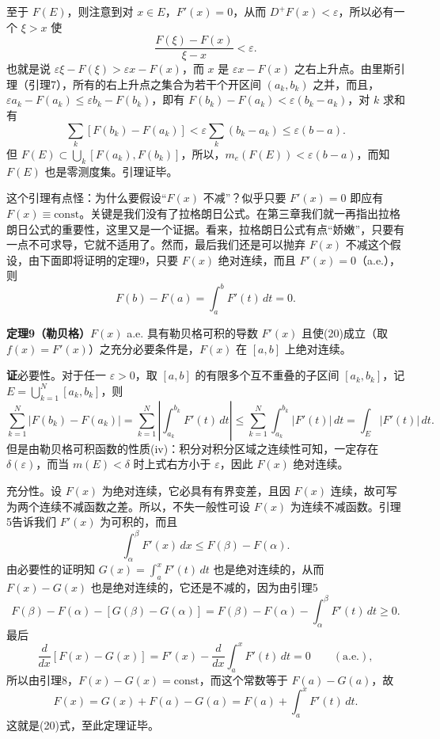 至于 $F(E)$，则注意到对 $x\in E$，$F'(x)=0$，从而 $D^+F(x)<\varepsilon$，所以必有一个 $\xi>x$ 使
\[
 \frac{F(\xi)-F(x)}{\xi-x}<\varepsilon.
\]
也就是说 $\varepsilon\xi-F(\xi)>\varepsilon x-F(x)$，而 $x$ 是 $\varepsilon x-F(x)$ 之右上升点。由里斯引理（引理7），所有的右上升点之集合为若干个开区间 $(a_k,b_k)$ 之并，而且，$\varepsilon a_k-F(a_k)\le\varepsilon b_k-F(b_k)$，即有 $F(b_k)-F(a_k)<\varepsilon(b_k-a_k)$，对 $k$ 求和有
\[
 \sum_k[F(b_k)-F(a_k)]<\varepsilon\sum_k(b_k-a_k)\le\varepsilon(b-a).
\]
但 $F(E)\subset\bigcup_k[F(a_k),F(b_k)]$，所以，$m_e(F(E))<\varepsilon(b-a)$，而知 $F(E)$ 也是零测度集。引理证毕。

这个引理有点怪：为什么要假设“$F(x)$ 不减”？似乎只要 $F'(x)=0$ 即应有 $F(x)\equiv\text{const}$。关键是我们没有了拉格朗日公式。在第三章我们就一再指出拉格朗日公式的重要性，这里又是一个证据。看来，拉格朗日公式有点“娇嫩”，只要有一点不可求导，它就不适用了。然而，最后我们还是可以抛弃 $F(x)$ 不减这个假设，由下面即将证明的定理9，只要 $F(x)$ 绝对连续，而且 $F'(x)=0$（a.e.），则
\[
 F(b)-F(a)=\int_a^bF'(t)\,dt=0.
\]

\noindent\textbf{定理9（勒贝格）}\quad $F(x)$ a.e. 具有勒贝格可积的导数 $F'(x)$ 且使(20)成立（取 $f(x)=F'(x)$）之充分必要条件是，$F(x)$ 在 $[a,b]$ 上绝对连续。

\noindent\textbf{证}\quad 必要性。对于任一 $\varepsilon>0$，取 $[a,b]$ 的有限多个互不重叠的子区间 $[a_k,b_k]$，记 $E=\bigcup_{k=1}^N[a_k,b_k]$，则
\[
 \sum_{k=1}^N|F(b_k)-F(a_k)|
 =\sum_{k=1}^N\left|\int_{a_k}^{b_k}F'(t)\,dt\right|
 \le\sum_{k=1}^N\int_{a_k}^{b_k}|F'(t)|\,dt
 =\int_E|F'(t)|\,dt.
\]
但是由勒贝格可积函数的性质(iv)：积分对积分区域之连续性可知，一定存在 $\delta(\varepsilon)$，而当 $m(E)<\delta$ 时上式右方小于 $\varepsilon$，因此 $F(x)$ 绝对连续。

充分性。设 $F(x)$ 为绝对连续，它必具有有界变差，且因 $F(x)$ 连续，故可写为两个连续不减函数之差。所以，不失一般性可设 $F(x)$ 为连续不减函数。引理5告诉我们 $F'(x)$ 为可积的，而且
\[
 \int_\alpha^\beta F'(x)\,dx\le F(\beta)-F(\alpha).
\]
由必要性的证明知 $G(x)=\int_a^xF'(t)\,dt$ 也是绝对连续的，从而 $F(x)-G(x)$ 也是绝对连续的，它还是不减的，因为由引理5
\[
 F(\beta)-F(\alpha)-[G(\beta)-G(\alpha)]
 =F(\beta)-F(\alpha)-\int_\alpha^\beta F'(t)\,dt\ge0.
\]
最后
\[
 \frac{d}{dx}[F(x)-G(x)]
 =F'(x)-\frac{d}{dx}\int_a^xF'(t)\,dt=0\qquad(\text{a.e.}),
\]
所以由引理8，$F(x)-G(x)=\text{const}$，而这个常数等于 $F(a)-G(a)$，故
\[
 F(x)=G(x)+F(a)-G(a)=F(a)+\int_a^xF'(t)\,dt.
\]
这就是(20)式，至此定理证毕。

